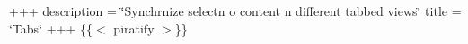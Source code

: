 +++ description = \char`\"{}\+Synchr\textquotesingle{}nize select\textquotesingle{}n o\textquotesingle{} content \textquotesingle{}n different tabbed views\char`\"{} title = \char`\"{}\+Tabs\char`\"{} +++ \{\{$<$ piratify $>$\}\} 